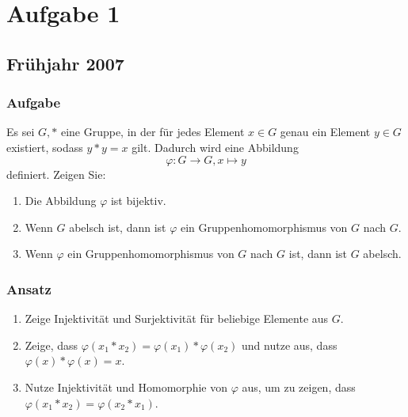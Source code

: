 \chapter{Aufgabe 1}

\section{Frühjahr 2007}

\subsection{Aufgabe}
Es sei \( G, * \) eine Gruppe, in der für jedes Element \( x \in G \) genau ein Element \( y \in G \) existiert, sodass \( y*y = x \) gilt. Dadurch wird eine Abbildung
\begin{equation*}
	\varphi: G \to G, x \mapsto y
\end{equation*}
definiert. Zeigen Sie:
\begin{enumerate}
	\item Die Abbildung \( \varphi \) ist bijektiv.
	\item Wenn \( G \) abelsch ist, dann ist \( \varphi \) ein Gruppenhomomorphismus von \( G \) nach \( G \).
	\item Wenn \( \varphi \) ein Gruppenhomomorphismus von \( G \) nach \( G \) ist, dann ist \( G \) abelsch. 
\end{enumerate}

\subsection{Ansatz}
\begin{enumerate}
	\item Zeige Injektivität und Surjektivität für beliebige Elemente aus \( G \).
	\item Zeige, dass \( \varphi(x_1*x_2) = \varphi(x_1)*\varphi(x_2) \) und nutze aus, dass \( \varphi(x)*\varphi(x) = x \).
	\item Nutze Injektivität und Homomorphie von \( \varphi \) aus, um zu zeigen, dass \( \varphi(x_1*x_2) = \varphi(x_2 * x_1) \).
\end{enumerate}

